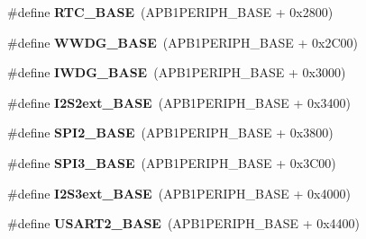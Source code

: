 \begin{DoxyCompactItemize}
\item 
\#define {\bfseries R\+T\+C\+\_\+\+B\+A\+SE}~(A\+P\+B1\+P\+E\+R\+I\+P\+H\+\_\+\+B\+A\+SE + 0x2800)\hypertarget{group___peripheral__memory__map_ga4265e665d56225412e57a61d87417022}{}\label{group___peripheral__memory__map_ga4265e665d56225412e57a61d87417022}

\item 
\#define {\bfseries W\+W\+D\+G\+\_\+\+B\+A\+SE}~(A\+P\+B1\+P\+E\+R\+I\+P\+H\+\_\+\+B\+A\+SE + 0x2\+C00)\hypertarget{group___peripheral__memory__map_ga9a5bf4728ab93dea5b569f5b972cbe62}{}\label{group___peripheral__memory__map_ga9a5bf4728ab93dea5b569f5b972cbe62}

\item 
\#define {\bfseries I\+W\+D\+G\+\_\+\+B\+A\+SE}~(A\+P\+B1\+P\+E\+R\+I\+P\+H\+\_\+\+B\+A\+SE + 0x3000)\hypertarget{group___peripheral__memory__map_ga8543ee4997296af5536b007cd4748f55}{}\label{group___peripheral__memory__map_ga8543ee4997296af5536b007cd4748f55}

\item 
\#define {\bfseries I2\+S2ext\+\_\+\+B\+A\+SE}~(A\+P\+B1\+P\+E\+R\+I\+P\+H\+\_\+\+B\+A\+SE + 0x3400)\hypertarget{group___peripheral__memory__map_gaa5f7b241ed5b756decd835300c9e7bc9}{}\label{group___peripheral__memory__map_gaa5f7b241ed5b756decd835300c9e7bc9}

\item 
\#define {\bfseries S\+P\+I2\+\_\+\+B\+A\+SE}~(A\+P\+B1\+P\+E\+R\+I\+P\+H\+\_\+\+B\+A\+SE + 0x3800)\hypertarget{group___peripheral__memory__map_gac3e357b4c25106ed375fb1affab6bb86}{}\label{group___peripheral__memory__map_gac3e357b4c25106ed375fb1affab6bb86}

\item 
\#define {\bfseries S\+P\+I3\+\_\+\+B\+A\+SE}~(A\+P\+B1\+P\+E\+R\+I\+P\+H\+\_\+\+B\+A\+SE + 0x3\+C00)\hypertarget{group___peripheral__memory__map_gae634fe8faa6922690e90fbec2fc86162}{}\label{group___peripheral__memory__map_gae634fe8faa6922690e90fbec2fc86162}

\item 
\#define {\bfseries I2\+S3ext\+\_\+\+B\+A\+SE}~(A\+P\+B1\+P\+E\+R\+I\+P\+H\+\_\+\+B\+A\+SE + 0x4000)\hypertarget{group___peripheral__memory__map_ga89b61d6e6b09e94f3fccb7bef34e0263}{}\label{group___peripheral__memory__map_ga89b61d6e6b09e94f3fccb7bef34e0263}

\item 
\#define {\bfseries U\+S\+A\+R\+T2\+\_\+\+B\+A\+SE}~(A\+P\+B1\+P\+E\+R\+I\+P\+H\+\_\+\+B\+A\+SE + 0x4400)\hypertarget{group___peripheral__memory__map_gade83162a04bca0b15b39018a8e8ec090}{}\label{group___peripheral__memory__map_gade83162a04bca0b15b39018a8e8ec090}


\end{DoxyCompactItemize}
